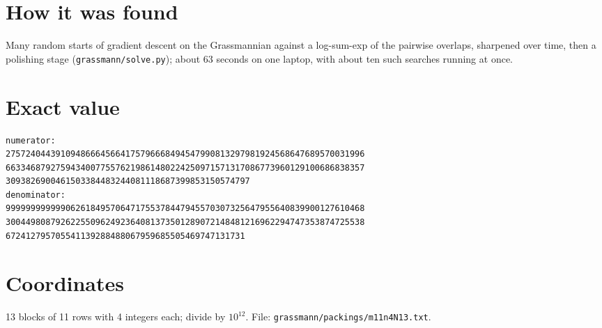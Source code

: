 \documentclass[11pt,a4paper]{article}
\begin{document}
\section{How it was found}
Many random starts of gradient descent on the Grassmannian against a log-sum-exp of the pairwise overlaps, sharpened over time, then a polishing stage (\texttt{grassmann/solve.py}); about 63 seconds on one laptop, with about ten such searches running at once.


\appendix
\section{Exact value}
{\small
\begin{verbatim}
numerator:
275724044391094866645664175796668494547990813297981924568647689570031996
663346879275943400775576219861480224250971571317086773960129100686838357
3093826900461503384483244081118687399853150574797
denominator:
999999999999062618495706471755378447945570307325647955640839900127610468
300449808792622550962492364081373501289072148481216962294747353874725538
672412795705541139288488067959685505469747131731
\end{verbatim}}

\section{Coordinates}
13 blocks of 11 rows with 4 integers each; divide by $10^{12}$. File: \texttt{grassmann/packings/m11n4N13.txt}.
{\tiny
\begin{multicols}{3}
\end{multicols}}
\end{document}
